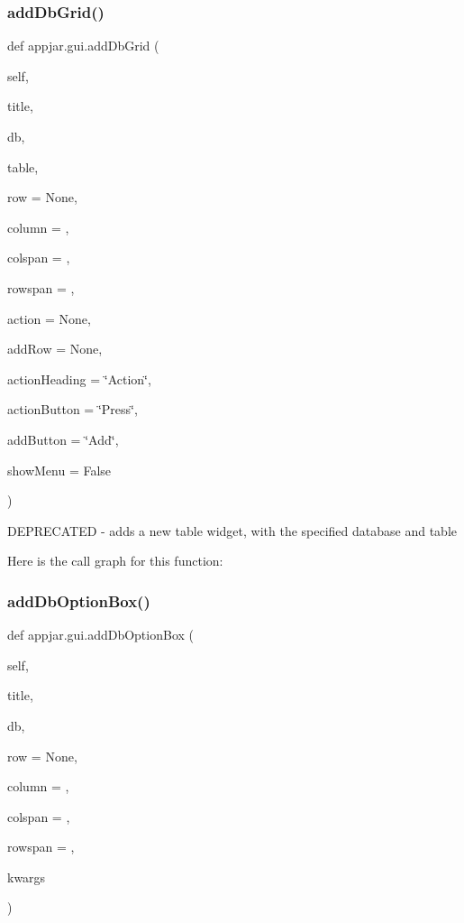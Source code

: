 \subsubsection{\texorpdfstring{add\+Db\+Grid()}{addDbGrid()}}
{\footnotesize\ttfamily def appjar.\+gui.\+add\+Db\+Grid (\begin{DoxyParamCaption}\item[{}]{self,  }\item[{}]{title,  }\item[{}]{db,  }\item[{}]{table,  }\item[{}]{row = {\ttfamily None},  }\item[{}]{column = {},  }\item[{}]{colspan = {},  }\item[{}]{rowspan = {},  }\item[{}]{action = {\ttfamily None},  }\item[{}]{add\+Row = {\ttfamily None},  }\item[{}]{action\+Heading = {\ttfamily \char`\"{}Action\char`\"{}},  }\item[{}]{action\+Button = {\ttfamily \char`\"{}Press\char`\"{}},  }\item[{}]{add\+Button = {\ttfamily \char`\"{}Add\char`\"{}},  }\item[{}]{show\+Menu = {\ttfamily False} }\end{DoxyParamCaption})}

\begin{DoxyVerb}DEPRECATED - adds a new table widget, with the specified database and table \end{DoxyVerb}
 Here is the call graph for this function\+:
\mbox{\label{classappjar_1_1gui_ad4bee7fc1c236d3b317fa2873900ab49}} 
\subsubsection{\texorpdfstring{add\+Db\+Option\+Box()}{addDbOptionBox()}}
{\footnotesize\ttfamily def appjar.\+gui.\+add\+Db\+Option\+Box (\begin{DoxyParamCaption}\item[{}]{self,  }\item[{}]{title,  }\item[{}]{db,  }\item[{}]{row = {\ttfamily None},  }\item[{}]{column = {},  }\item[{}]{colspan = {},  }\item[{}]{rowspan = {},  }\item[{}]{kwargs }\end{DoxyParamCaption})}

